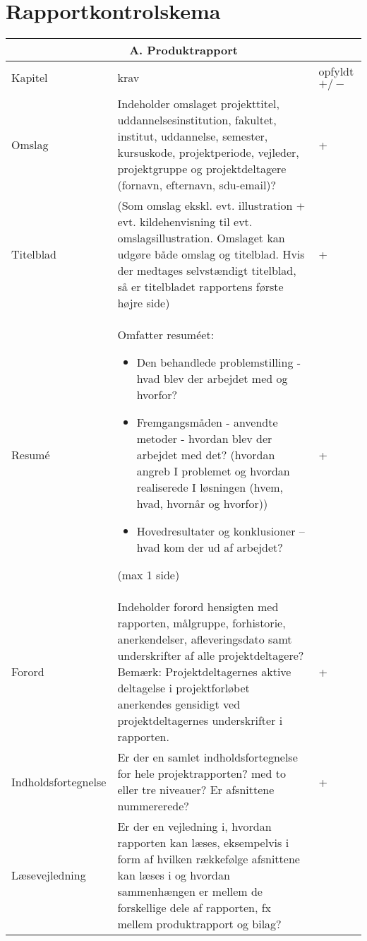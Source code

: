 \section{Rapportkontrolskema}
\begin{center}
\begin{longtable}{|m{3.5cm}|m{10cm}|m{2.5cm}|}
\hline
\multicolumn{3}{|c|}{A. Produktrapport} \\
\hline
Kapitel & krav & opfyldt $+/-$ \\ \hline
Omslag & Indeholder omslaget projekttitel, uddannelsesinstitution, fakultet, institut, uddannelse, semester, kursuskode, projektperiode, vejleder, projektgruppe og projektdeltagere (fornavn, efternavn, sdu-email)? & + \\
\hline
Titelblad & (Som omslag ekskl. evt. illustration + evt. kildehenvisning til evt. omslagsillustration. Omslaget kan udgøre både omslag og titelblad. Hvis der medtages selvstændigt titelblad, så er titelbladet rapportens første højre side) & + \\
\hline
Resumé & 
Omfatter resuméet:
\begin{itemize}
\item Den behandlede problemstilling - hvad blev der arbejdet med og hvorfor?
\item Fremgangsmåden - anvendte metoder - hvordan blev der arbejdet med det? 
(hvordan angreb I problemet og hvordan realiserede I løsningen (hvem, hvad, hvornår og hvorfor))
\item Hovedresultater og konklusioner  – hvad kom der ud af arbejdet?
\end{itemize}
(max  1 side)& +\\
\hline
Forord & Indeholder forord hensigten med rapporten, målgruppe, forhistorie, anerkendelser, afleveringsdato samt underskrifter af alle projektdeltagere? \newline
Bemærk: Projektdeltagernes aktive deltagelse i projektforløbet anerkendes gensidigt ved projektdeltagernes underskrifter i rapporten. & +\\
\hline
Indholdsfortegnelse & Er der en samlet indholdsfortegnelse for hele projektrapporten? 
\newline med to eller tre niveauer?
\newline Er afsnittene nummererede? & + \\
\hline
Læsevejledning & Er der en vejledning i, hvordan rapporten kan læses, eksempelvis i form af hvilken rækkefølge afsnittene kan læses i og hvordan sammenhængen er mellem de forskellige dele af rapporten, fx mellem produktrapport og bilag? 

\end{longtable}
\end{center}
